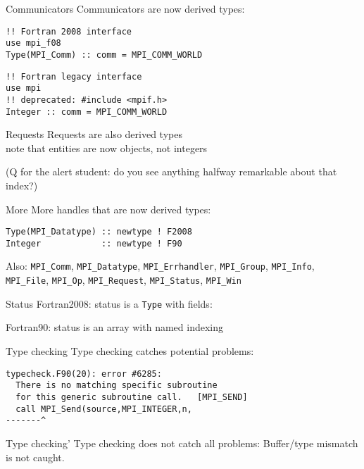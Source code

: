 \begin{numberedframe}{Communicators}
Communicators are now derived types:
\begin{lstlisting}
!! Fortran 2008 interface
use mpi_f08
Type(MPI_Comm) :: comm = MPI_COMM_WORLD
\end{lstlisting}
\begin{lstlisting}
!! Fortran legacy interface
use mpi
!! deprecated: #include <mpif.h>
Integer :: comm = MPI_COMM_WORLD
\end{lstlisting}
\end{numberedframe}

\begin{numberedframe}{Requests}
  Requests are also derived types\\
  note that  entities are now objects, not integers


  (Q for the alert student: do you see anything halfway
  remarkable about that index?)
\end{numberedframe}

\begin{numberedframe}{More}
  More handles that are now derived types:
\begin{lstlisting}
Type(MPI_Datatype) :: newtype ! F2008
Integer            :: newtype ! F90
\end{lstlisting}

Also:
  \lstinline{MPI_Comm}, \lstinline{MPI_Datatype},
  \lstinline{MPI_Errhandler}, \lstinline{MPI_Group},
  \lstinline{MPI_Info}, \lstinline{MPI_File}, \lstinline{MPI_Op},
  \lstinline{MPI_Request}, \lstinline{MPI_Status}, \lstinline{MPI_Win}
\end{numberedframe}

\begin{numberedframe}{Status}
  Fortran2008: status is a \lstinline{Type} with fields:

  Fortran90: status is an array with named indexing
\end{numberedframe}

\begin{numberedframe}{Type checking}
  Type checking catches potential problems:
\begin{verbatim}
typecheck.F90(20): error #6285: 
  There is no matching specific subroutine
  for this generic subroutine call.   [MPI_SEND]
  call MPI_Send(source,MPI_INTEGER,n,
-------^
\end{verbatim}
\end{numberedframe}

\begin{numberedframe}{Type checking'}
  Type checking does not catch all problems:
  Buffer/type mismatch is not caught.
\end{numberedframe}

\lstset{language=C}
